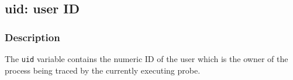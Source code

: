\clearpage
{}
{}
\label{vars:uid}
\subsection*{uid: user ID}

\subsubsection*{Description}

The \verb|uid| variable contains the numeric ID of the user which is
the owner of the process being traced by the currently executing probe.


